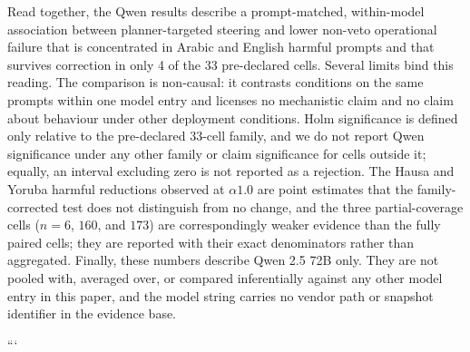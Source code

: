 Read together, the Qwen results describe a prompt-matched, within-model
association between planner-targeted steering and lower non-veto operational
failure that is concentrated in Arabic and English harmful prompts and that
survives correction in only 4 of the 33 pre-declared cells. Several limits bind
this reading. The comparison is non-causal: it contrasts conditions on the same
prompts within one model entry and licenses no mechanistic claim and no claim
about behaviour under other deployment conditions. Holm significance is defined
only relative to the pre-declared 33-cell family, and we do not report Qwen
significance under any other family or claim significance for cells outside it;
equally, an interval excluding zero is not reported as a rejection. The Hausa
and Yoruba harmful reductions observed at $\alpha1.0$ are point estimates that
the family-corrected test does not distinguish from no change, and the three
partial-coverage cells ($n = 6$, $160$, and $173$) are correspondingly weaker
evidence than the fully paired cells; they are reported with their exact
denominators rather than aggregated. Finally, these numbers describe Qwen 2.5
72B only. They are not pooled with, averaged over, or compared inferentially
against any other model entry in this paper, and the model string carries no
vendor path or snapshot identifier in the evidence base.

```
